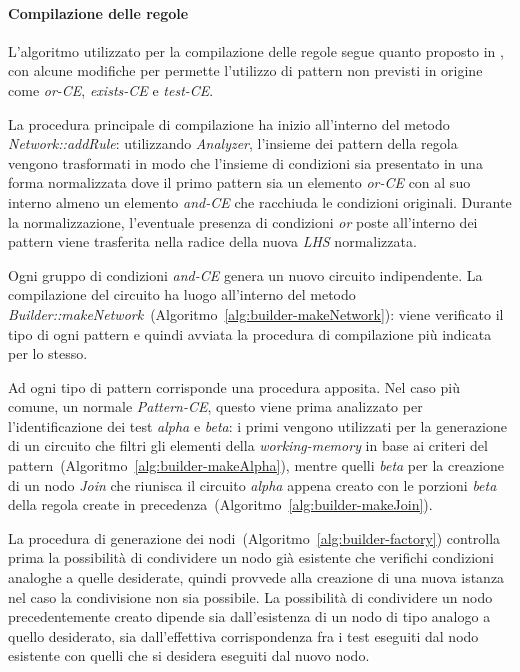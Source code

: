 \paragraph{Compilazione delle regole}

L'algoritmo utilizzato per la compilazione delle regole segue quanto proposto in \cite{Doorenbos95productionmatching}, con alcune modifiche per permette l'utilizzo di pattern non previsti in origine come \emph{or-CE}, \emph{exists-CE} e \emph{test-CE}.

La procedura principale di compilazione ha inizio all'interno del metodo \emph{Network::addRule}: utilizzando \emph{Analyzer}, l'insieme dei pattern della regola vengono trasformati in modo che l'insieme di condizioni sia presentato in una forma normalizzata dove il primo pattern sia un elemento \emph{or-CE} con al suo interno almeno un elemento \emph{and-CE} che racchiuda le condizioni originali. Durante la normalizzazione, l'eventuale presenza di condizioni \emph{or} poste all'interno dei pattern viene trasferita nella radice della nuova \emph{LHS} normalizzata.



Ogni gruppo di condizioni \emph{and-CE} genera un nuovo circuito indipendente. La compilazione del circuito ha luogo all'interno del metodo \emph{Builder::makeNetwork}~(Algoritmo~\ref{alg:builder-makeNetwork}): viene verificato il tipo di ogni pattern e quindi avviata la procedura di compilazione più indicata per lo stesso.







Ad ogni tipo di pattern corrisponde una procedura apposita. Nel caso più comune, un normale \emph{Pattern-CE}, questo viene prima analizzato per l'identificazione dei test \emph{alpha} e \emph{beta}: i primi vengono utilizzati per la generazione di un circuito che filtri gli elementi della \emph{working-memory} in base ai criteri del pattern~(Algoritmo~\ref{alg:builder-makeAlpha}), mentre quelli \emph{beta} per la creazione di un nodo \emph{Join} che riunisca il circuito \emph{alpha} appena creato con le porzioni \emph{beta} della regola create in precedenza~(Algoritmo~\ref{alg:builder-makeJoin}).



La procedura di generazione dei nodi~(Algoritmo~\ref{alg:builder-factory}) controlla prima la possibilità di condividere un nodo già esistente che verifichi condizioni analoghe a quelle desiderate, quindi provvede alla creazione di una nuova istanza nel caso la condivisione non sia possibile. La possibilità di condividere un nodo precedentemente creato dipende sia dall'esistenza di un nodo di tipo analogo a quello desiderato, sia dall'effettiva corrispondenza fra i test eseguiti dal nodo esistente con quelli che si desidera eseguiti dal nuovo nodo.



